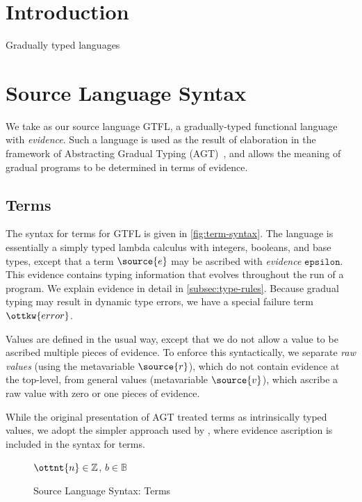\documentclass[11pt]{article}
\begin{document}
\section{Introduction}

Gradually typed languages

\section{Source Language Syntax}

We take as our source language GTFL, a gradually-typed functional language
with \textit{evidence}. Such a language is used as the result of
elaboration in the framework of Abstracting Gradual Typing (AGT)~\citep{agt},
and allows the meaning of gradual programs to be determined in terms of evidence.

\subsection{Terms}
 
The syntax for terms for GTFL is given in \autoref{fig:term-syntax}.
The language is essentially a simply typed lambda calculus with
integers, booleans, and base types, except that a term $\source{e}$ 
may be ascribed with \textit{evidence} $\mathtt{ epsilon }$.
This evidence contains typing information that evolves throughout the run of a program.
We explain evidence in detail in \autoref{subsec:type-rules}.
Because gradual typing may result in dynamic type errors, we have a special failure term $\ottkw{error}$.

Values are defined in the usual way, except that we do not allow a value to be
ascribed multiple pieces of evidence. To enforce this syntactically, we separate \textit{raw values}
(using the metavariable $\source{r}$), which do not contain evidence at the top-level,
from general values (metavariable $\source{v}$), which ascribe a raw value with zero or one pieces of evidence.

While the original presentation of AGT treated terms as intrinsically typed values,
we adopt the simpler approach used by \citet{Toro:2019:GPR:3302515.3290330}, where evidence ascription
is included in the syntax for terms. 

\begin{figure}[H] 
	$\ottnt{n} \in \mathbb{Z}$, $b\in\mathbb{B}$

	\caption{Source Language Syntax: Terms}
	\label{fig:term-syntax}
\end{figure}
\end{document}
